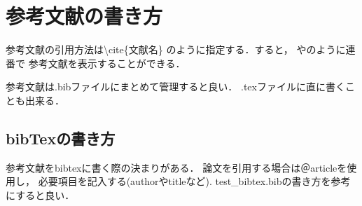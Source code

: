 \documentclass[titlepage,12pt,a4paper]{jarticle}
\begin{document}
\section{参考文献の書き方}
参考文献の引用方法は\textbackslash cite\{文献名\}
のように指定する．すると，
\cite{ec_kui}や\cite{globus_toolkit}のように連番で
参考文献を表示することができる．

参考文献は.bibファイルにまとめて管理すると良い．
.texファイルに直に書くことも出来る．

\subsection{bibTexの書き方}
参考文献をbibtexに書く際の決まりがある．
論文を引用する場合は＠articleを使用し，
必要項目を記入する(authorやtitleなど).
test\_bibtex.bibの書き方を参考にすると良い．



\end{document}
